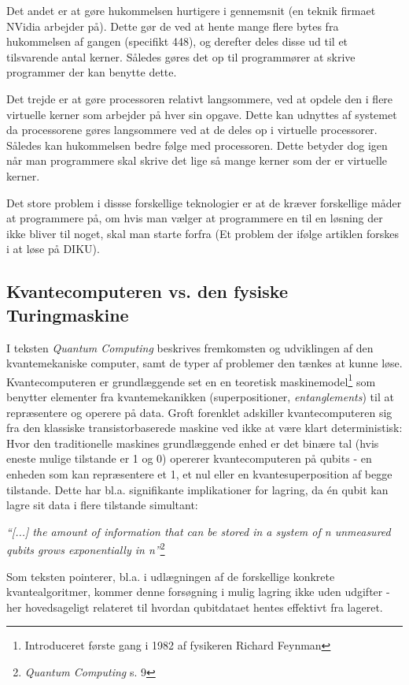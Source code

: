 \documentclass[10pt,a4paper]{article}
\newcommand{\citat}[2]{\begin{justify}\textit{``#1''}\hspace{0.1cm}\footnote{#2}\end{justify}}
\begin{document}
Det andet er at gøre hukommelsen hurtigere i gennemsnit (en teknik firmaet
NVidia arbejder på). Dette gør de ved at hente mange flere bytes fra hukommelsen
af gangen (specifikt 448), og derefter deles disse ud til et tilsvarende antal
kerner. Således gøres det op til programmører at skrive programmer der kan
benytte dette.

Det trejde er at gøre processoren relativt langsommere, ved at opdele den i
flere virtuelle kerner som arbejder på hver sin opgave. Dette kan udnyttes af
systemet da processorene gøres langsommere ved at de deles op i virtuelle
processorer. Således kan hukommelsen bedre følge med processoren. Dette betyder
dog igen når man programmere skal skrive det lige så mange kerner som der er
virtuelle kerner.

Det store problem i dissse forskellige teknologier er at de kræver forskellige
måder at programmere på, om hvis man vælger at programmere en til en løsning der
ikke bliver til noget, skal man starte forfra (Et problem der ifølge artiklen
forskes i at løse på DIKU).

\subsection{Kvantecomputeren vs. den fysiske Turingmaskine}
I teksten \textit{Quantum Computing} beskrives fremkomsten og udviklingen 
af den kvantemekaniske computer, samt de typer af problemer den tænkes at
kunne løse.
Kvantecomputeren er grundlæggende set en en teoretisk maskinemodel\footnote{
Introduceret første gang i 1982 af fysikeren Richard Feynman} som benytter 
elementer fra kvantemekanikken (superpositioner, \textit{entanglements}) til 
at repræsentere og operere på data. Groft forenklet adskiller kvantecomputeren
sig fra den klassiske transistorbaserede maskine ved ikke at være klart
deterministisk: Hvor den traditionelle maskines grundlæggende enhed er det binære 
tal (hvis eneste mulige tilstande er 1 og 0) opererer kvantecomputeren på qubits
- en enheden som kan repræsentere et 1, et nul eller en kvantesuperposition af 
begge tilstande. Dette har bl.a. signifikante implikationer for lagring, da én qubit 
kan lagre sit data i flere tilstande simultant: 
\citat{[...] the amount of information that can be stored in a system of  
\textit{n} unmeasured qubits grows exponentially in \textit{n}}{\textit{Quantum Computing} s. 9}
Som teksten 
pointerer, bl.a. i udlægningen af de forskellige konkrete kvantealgoritmer, 
kommer denne forsøgning i mulig lagring ikke uden udgifter - her hovedsageligt 
relateret til hvordan qubitdataet hentes effektivt fra lageret. 
\end{document}

